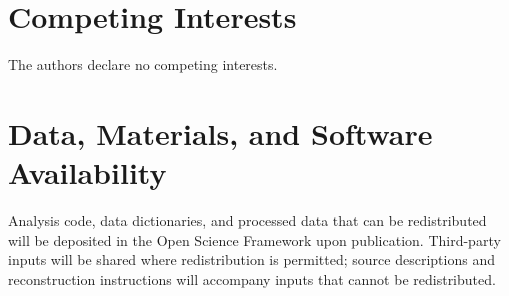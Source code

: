 \documentclass[10pt]{article}
\begin{document}
\section*{Competing Interests}

The authors declare no competing interests.

\section*{Data, Materials, and Software Availability}
Analysis code, data dictionaries, and processed data that can be redistributed will be deposited in the Open Science Framework upon publication. Third-party inputs will be shared where redistribution is permitted; source descriptions and reconstruction instructions will accompany inputs that cannot be redistributed.




\end{document}
